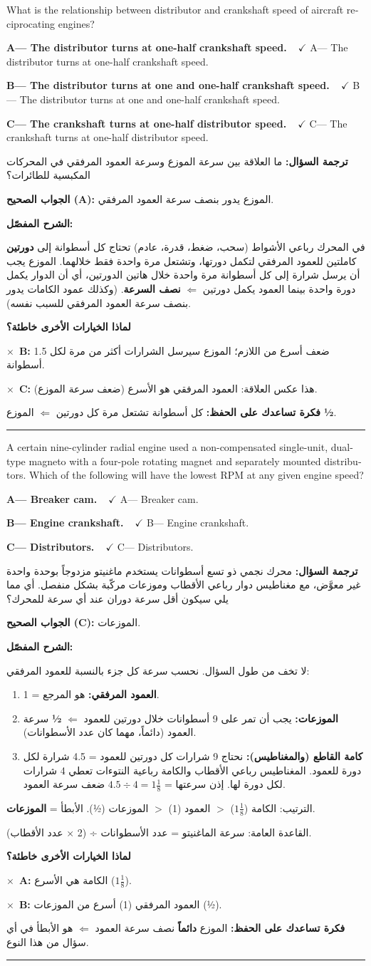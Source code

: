 \documentclass[11pt,a4paper]{article}
\newcommand{\en}[1]{\textenglish{#1}}
\newcommand{\correctletter}{}
\newcommand{\opt}[2]{%
  \ifdefstring{\correctletter}{#1}%
    {\textcolor{ansgreen}{\textbf{#1— #2\ \ $\checkmark$}}}%
    {#1— #2}\par}
\newcommand{\Q}[6]{%
  \renewcommand{\correctletter}{#6}%
  \par\bigskip
  \phantomsection\label{q#1}%
  \begin{tcolorbox}[enhanced,breakable,colback=qback,colframe=qframe,
      arc=2mm,boxrule=0.8pt,fonttitle=\bfseries,
      title={\en{Question #1}}]
    \begin{english}
      #2\par\smallskip
      \opt{A}{#3}\opt{B}{#4}\opt{C}{#5}
    \end{english}
  \end{tcolorbox}}
\newcommand{\tr}[1]{\textbf{\textcolor{qframe}{ترجمة السؤال:}} #1\par}
\newcommand{\ans}[2]{%
  \begin{tcolorbox}[colback=ansback,colframe=ansgreen,boxrule=0.6pt,arc=1.5mm,
      left=4pt,right=4pt,top=2pt,bottom=2pt]
    \textbf{\textcolor{ansgreen}{الجواب الصحيح (\en{#1}):}} #2
  \end{tcolorbox}}
\newcommand{\sharh}[1]{\textbf{\textcolor{conceptc}{الشرح المفصّل:}}\par #1\par}
\newcommand{\nohead}{\textbf{\textcolor{wrongc}{لماذا الخيارات الأخرى خاطئة؟}}\par}
\newcommand{\no}[2]{\hspace*{1em}\textcolor{wrongc}{$\times$}\ \textbf{\en{#1}:} #2\par}
\newcommand{\tip}[1]{%
  \begin{tcolorbox}[colback=tipback,colframe=tipframe,boxrule=0.5pt,arc=1.5mm,
      left=4pt,right=4pt,top=2pt,bottom=2pt]
    \textbf{فكرة تساعدك على الحفظ:} #1
  \end{tcolorbox}}
\newcommand{\qsep}{\par\medskip\noindent\textcolor{qframe!40}{\rule{\linewidth}{0.4pt}}\par}
\begin{document}
\Q{8605}{What is the relationship between distributor and crankshaft speed of aircraft reciprocating engines?}
{The distributor turns at one-half crankshaft speed.}
{The distributor turns at one and one-half crankshaft speed.}
{The crankshaft turns at one-half distributor speed.}{A}
\tr{ما العلاقة بين سرعة الموزع وسرعة العمود المرفقي في المحركات المكبسية للطائرات؟}
\ans{A}{الموزع يدور بنصف سرعة العمود المرفقي.}
\sharh{في المحرك رباعي الأشواط (سحب، ضغط، قدرة، عادم) تحتاج كل أسطوانة إلى \textbf{دورتين} كاملتين للعمود المرفقي لتكمل دورتها، وتشتعل مرة واحدة فقط خلالهما. الموزع يجب أن يرسل شرارة إلى كل أسطوانة مرة واحدة خلال هاتين الدورتين، أي أن الدوار يكمل دورة واحدة بينما العمود يكمل دورتين $\Leftarrow$ \textbf{نصف السرعة}. (وكذلك عمود الكامات يدور بنصف سرعة العمود المرفقي للسبب نفسه).}
\nohead
\no{B}{1.5 ضعف أسرع من اللازم؛ الموزع سيرسل الشرارات أكثر من مرة لكل أسطوانة.}
\no{C}{هذا عكس العلاقة: العمود المرفقي هو الأسرع (ضعف سرعة الموزع).}
\tip{كل أسطوانة تشتعل مرة كل دورتين $\Leftarrow$ الموزع \textbf{½}.}
\qsep

\Q{8544}{A certain nine-cylinder radial engine used a non-compensated single-unit, dual-type magneto with a four-pole rotating magnet and separately mounted distributors. Which of the following will have the lowest RPM at any given engine speed?}
{Breaker cam.}
{Engine crankshaft.}
{Distributors.}{C}
\tr{محرك نجمي ذو تسع أسطوانات يستخدم ماغنيتو مزدوجاً بوحدة واحدة غير معوَّض، مع مغناطيس دوار رباعي الأقطاب وموزعات مركّبة بشكل منفصل. أي مما يلي سيكون أقل سرعة دوران عند أي سرعة للمحرك؟}
\ans{C}{الموزعات.}
\sharh{لا تخف من طول السؤال. نحسب سرعة كل جزء بالنسبة للعمود المرفقي:
\begin{enumerate}[label=\arabic*.]
  \item \textbf{العمود المرفقي:} هو المرجع = 1.
  \item \textbf{الموزعات:} يجب أن تمر على 9 أسطوانات خلال دورتين للعمود $\Leftarrow$ \textbf{½} سرعة العمود (دائماً، مهما كان عدد الأسطوانات).
  \item \textbf{كامة القاطع (والمغناطيس):} نحتاج 9 شرارات كل دورتين للعمود = 4.5 شرارة لكل دورة للعمود. المغناطيس رباعي الأقطاب والكامة رباعية النتوءات تعطي 4 شرارات لكل دورة لها. إذن سرعتها = $4.5 \div 4 = 1\frac{1}{8}$ ضعف سرعة العمود.
\end{enumerate}
الترتيب: الكامة ($1\frac{1}{8}$) $>$ العمود (1) $>$ الموزعات (½). الأبطأ = \textbf{الموزعات}.

القاعدة العامة: سرعة الماغنيتو = عدد الأسطوانات ÷ (2 × عدد الأقطاب).}
\nohead
\no{A}{الكامة هي الأسرع ($1\frac{1}{8}$).}
\no{B}{العمود المرفقي (1) أسرع من الموزعات (½).}
\tip{الموزع \textbf{دائماً} نصف سرعة العمود $\Leftarrow$ هو الأبطأ في أي سؤال من هذا النوع.}
\qsep
\end{document}
